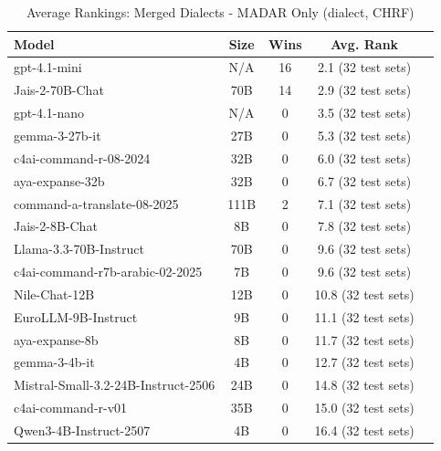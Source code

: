 \begin{table}[htbp]
\centering
\caption{Average Rankings: Merged Dialects - MADAR Only (dialect, CHRF)}
\label{tab:avg_rankings_chrf_dialect}
\begin{tabular}{l@{\hspace{3pt}}c@{\hspace{3pt}}c@{\hspace{3pt}}c@{\hspace{3pt}}c}
\toprule
Model & Size & Wins & Avg. Rank \\
\midrule
gpt-4.1-mini & N/A & 16 & 2.1 (32 test sets) \\
Jais-2-70B-Chat & 70B & 14 & 2.9 (32 test sets) \\
gpt-4.1-nano & N/A & 0 & 3.5 (32 test sets) \\
gemma-3-27b-it & 27B & 0 & 5.3 (32 test sets) \\
c4ai-command-r-08-2024 & 32B & 0 & 6.0 (32 test sets) \\
aya-expanse-32b & 32B & 0 & 6.7 (32 test sets) \\
command-a-translate-08-2025 & 111B & 2 & 7.1 (32 test sets) \\
Jais-2-8B-Chat & 8B & 0 & 7.8 (32 test sets) \\
Llama-3.3-70B-Instruct & 70B & 0 & 9.6 (32 test sets) \\
c4ai-command-r7b-arabic-02-2025 & 7B & 0 & 9.6 (32 test sets) \\
Nile-Chat-12B & 12B & 0 & 10.8 (32 test sets) \\
EuroLLM-9B-Instruct & 9B & 0 & 11.1 (32 test sets) \\
aya-expanse-8b & 8B & 0 & 11.7 (32 test sets) \\
gemma-3-4b-it & 4B & 0 & 12.7 (32 test sets) \\
Mistral-Small-3.2-24B-Instruct-2506 & 24B & 0 & 14.8 (32 test sets) \\
c4ai-command-r-v01 & 35B & 0 & 15.0 (32 test sets) \\
Qwen3-4B-Instruct-2507 & 4B & 0 & 16.4 (32 test sets) \\
\bottomrule
\end{tabular}
\end{table}